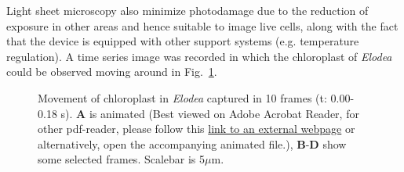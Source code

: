 Light sheet microscopy also minimize photodamage due to the reduction of exposure in other areas and hence suitable to image live cells, along with the fact that the device is equipped with other support systems (e.g. temperature regulation). 
A time series image was recorded in which the chloroplast of \textit{Elodea} could be observed moving around in Fig.~\ref{fig:Elomov}. 
\\
\begin{figure}[h]
\centering
{}\hspace{0.1mm}
\hspace{0.1mm}
\hspace{0.1mm}
\caption{Movement of chloroplast in \textit{Elodea} captured in 10 frames (t: 0.00-0.18 s). 
\textbf{A} is animated (Best viewed on Adobe Acrobat Reader, for other pdf-reader, please follow this \href{https://i.imgur.com/MbgWUVP.mp4}{link to an external webpage} or alternatively, open the accompanying animated file.), \textbf{B}-\textbf{D} show some selected frames. 
Scalebar is 5$\mu$m.} 
\label{fig:Elomov}
\end{figure}


\renewcommand{\refname}{\spacedlowsmallcaps{References}} %

%


